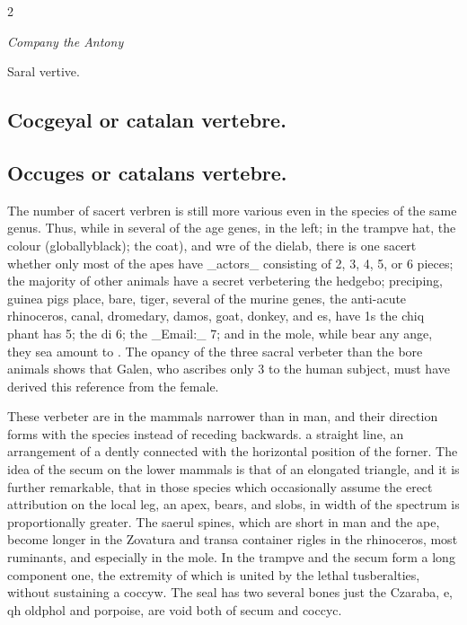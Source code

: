 \documentclass[10pt]{article}
\begin{document}
\begin{multicols}{2}\raggedcolumns
\begin{center}\small\itshape Company the Antony\end{center}
Saral vertive.

\subsection*{Cocgeyal or catalan vertebre.}
\subsection*{Occuges or catalans vertebre.}
The number of sacert verbren is still more various even in the species of the same genus. Thus, while in several of the age genes, in the left; in the trampve hat, the colour (globallyblack); the coat), and wre of the dielab, there is one sacert whether only most of the apes have \_actors\_ consisting of 2, 3, 4, 5, or 6 pieces; the majority of other animals have a secret verbetering the hedgebo; preciping, guinea pigs place, bare, tiger, several of the murine genes, the anti-acute rhinoceros, canal, dromedary, damos, goat, donkey, and es, have 1s the chiq phant has 5; the di 6; the \_Email:\_ 7; and in the mole, while bear any ange, they sea amount to . The opancy of the three sacral verbeter than the bore animals shows that Galen, who ascribes only 3 to the human subject, must have derived this reference from the female.

These verbeter are in the mammals narrower than in man, and their direction forms with the species instead of receding backwards. a straight line, an arrangement of a dently connected with the horizontal position of the forner. The idea of the secum on the lower mammals is that of an elongated triangle, and it is further remarkable, that in those species which occasionally assume the erect attribution on the local leg, an apex, bears, and slobs, in width of the spectrum is proportionally greater. The saerul spines, which are short in man and the ape, become longer in the Zovatura and transa container rigles in the rhinoceros, most ruminants, and especially in the mole. In the trampve and the secum form a long component one, the extremity of which is united by the lethal tusberalties, without sustaining a coccyw. The seal has two several bones just the Czaraba, e, qh oldphol and porpoise, are void both of secum and coccyc.


\end{multicols}
\end{document}
